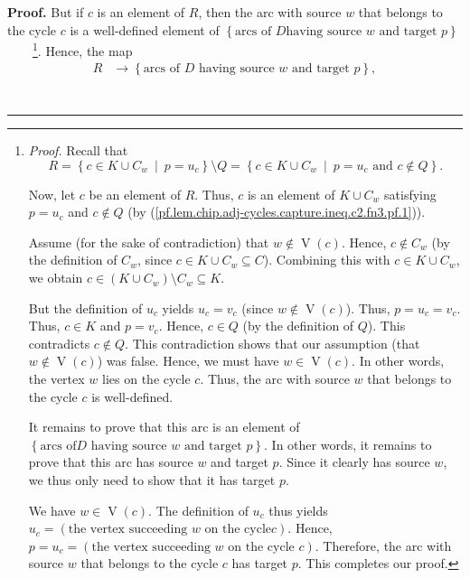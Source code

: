 \documentclass[numbers=enddot,12pt,final,onecolumn,notitlepage]{scrartcl}%
\theoremstyle{definition}
\newenvironment{proof}[1][Proof]{\noindent\textbf{#1.} }{\ \rule{0.5em}{0.5em}}
\begin{document}
\begin{proof}
But if $c$ is an element of $R$, then the arc with source $w$ that belongs to
the cycle $c$ is a well-defined element of $\left\{  \text{arcs of }D\text{
having source }w\text{ and target }p\right\}  $%
\ \ \ \ \footnote{\textit{Proof.} Recall that%
\begin{equation}
R=\left\{  c\in K\cup C_{w}\ \mid\ p=u_{c}\right\}  \setminus Q=\left\{  c\in
K\cup C_{w}\ \mid\ p=u_{c}\text{ and }c\notin Q\right\}
.\label{pf.lem.chip.adj-cycles.capture.ineq.c2.fn3.pf.1}%
\end{equation}
\par
Now, let $c$ be an element of $R$. Thus, $c$ is an element of $K\cup C_{w}$
satisfying $p=u_{c}$ and $c\notin Q$ (by
(\ref{pf.lem.chip.adj-cycles.capture.ineq.c2.fn3.pf.1})).
\par
Assume (for the sake of contradiction) that $w\notin\operatorname*{V}\left(
c\right)  $. Hence, $c\notin C_{w}$ (by the definition of $C_{w}$, since $c\in
K\cup C_{w}\subseteq C$). Combining this with $c\in K\cup C_{w}$, we obtain
$c\in\left(  K\cup C_{w}\right)  \setminus C_{w}\subseteq K$.
\par
But the definition of $u_{c}$ yields $u_{c}=v_{c}$ (since $w\notin%
\operatorname*{V}\left(  c\right)  $). Thus, $p=u_{c}=v_{c}$. Thus, $c\in K$
and $p=v_{c}$. Hence, $c\in Q$ (by the definition of $Q$). This contradicts
$c\notin Q$. This contradiction shows that our assumption (that $w\notin%
\operatorname*{V}\left(  c\right)  $) was false. Hence, we must have
$w\in\operatorname*{V}\left(  c\right)  $. In other words, the vertex $w$ lies
on the cycle $c$. Thus, the arc with source $w$ that belongs to the cycle $c$
is well-defined.
\par
It remains to prove that this arc is an element of $\left\{  \text{arcs of
}D\text{ having source }w\text{ and target }p\right\}  $. In other words, it
remains to prove that this arc has source $w$ and target $p$. Since it clearly
has source $w$, we thus only need to show that it has target $p$.
\par
We have $w\in\operatorname*{V}\left(  c\right)  $. The definition of $u_{c}$
thus yields $u_{c}=\left(  \text{the vertex succeeding }w\text{ on the cycle
}c\right)  $. Hence, $p=u_{c}=\left(  \text{the vertex succeeding }w\text{ on
the cycle }c\right)  $. Therefore, the arc with source $w$ that belongs to the
cycle $c$ has target $p$. This completes our proof.}. Hence, the map%
\begin{align*}
R  & \rightarrow\left\{  \text{arcs of }D\text{ having source }w\text{ and
target }p\right\}  ,\\

\end{align*}
\end{proof}
\end{document}
